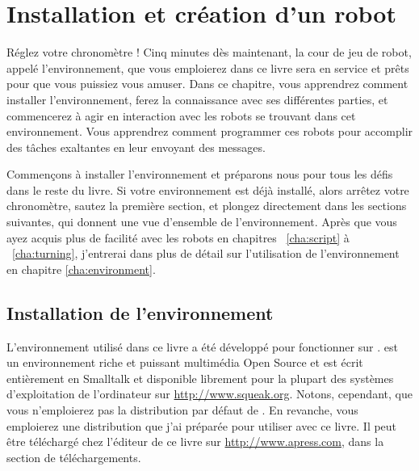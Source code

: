 \documentclass[a4paper,10pt,twoside]{book}
\begin{document}
    \sloppy
\fi

\chapter{Installation et cr\'eation d'un robot}\label{cha:installation}

R\'eglez votre chronom\`etre ! Cinq minutes d\`es maintenant, la cour de jeu de robot, appel\'e l'environnement, que vous emploierez dans ce livre sera en service et pr\^ets pour que vous puissiez vous amuser. Dans ce chapitre, vous apprendrez comment installer l'environnement, ferez la connaissance avec ses diff\'erentes parties, et commencerez \`a agir en interaction avec les robots se trouvant dans cet environnement. Vous apprendrez comment programmer ces robots pour accomplir des t\^aches exaltantes en leur envoyant des messages.

Commen\c cons \`a installer l'environnement et pr\'eparons nous pour tous les d\'efis dans le reste du livre. Si votre environnement est d\'ej\`a install\'e, alors arr\^etez votre chronom\`etre, sautez la premi\`ere section, et plongez directement dans les sections suivantes, qui donnent une vue d'ensemble de l'environnement. Apr\`es que vous ayez acquis plus de facilit\'e avec les robots en chapitres ~\ref{cha:script} \`a ~\ref{cha:turning}, j'entrerai dans plus de d\'etail sur l'utilisation de l'environnement en chapitre \ref{cha:environment}.


\newpage
\section{Installation de l'environnement}

L'environnement utilis\'e dans ce livre a \'et\'e d\'evelopp\'e pour fonctionner sur \Squeak. \Squeak est un environnement riche et puissant multim\'edia Open Source et est \'ecrit enti\`erement en Smalltalk et disponible librement pour la plupart des syst\`emes d'exploitation de l'ordinateur sur \url{http://www.squeak.org}. Notons, cependant, que vous n'emploierez pas la distribution par d\'efaut de \Squeak. En revanche, vous emploierez une distribution que j'ai pr\'epar\'ee pour utiliser avec ce livre. Il peut \^etre t\'el\'echarg\'e chez l'\'editeur de ce livre sur \url{http://www.apress.com}, dans la section de t\'el\'echargements.
\end{document}
